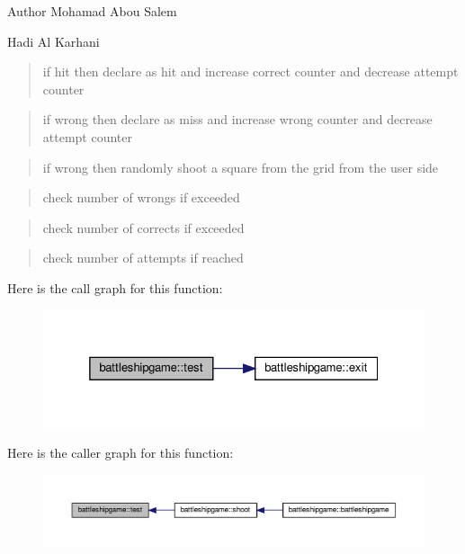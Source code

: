 \begin{DoxyAuthor}{Author}
Mohamad Abou Salem 

Hadi Al Karhani 
\end{DoxyAuthor}
\begin{quote}
if hit then declare as hit and increase correct counter and decrease attempt counter \end{quote}


\begin{quote}
if wrong then declare as miss and increase wrong counter and decrease attempt counter \end{quote}


\begin{quote}
if wrong then randomly shoot a square from the grid from the user side \end{quote}


\begin{quote}
check number of wrongs if exceeded \end{quote}


\begin{quote}
check number of corrects if exceeded \end{quote}


\begin{quote}
check number of attempts if reached \end{quote}
Here is the call graph for this function\+:
\nopagebreak
\begin{figure}[H]
\begin{center}
\leavevmode
\includegraphics[width=325pt]{classbattleshipgame_a2bc96daab5fee23ae0a5718416d52bec_cgraph}
\end{center}
\end{figure}
Here is the caller graph for this function\+:
\nopagebreak
\begin{figure}[H]
\begin{center}
\leavevmode
\includegraphics[width=350pt]{classbattleshipgame_a2bc96daab5fee23ae0a5718416d52bec_icgraph}
\end{center}
\end{figure}
\mbox{\label{classbattleshipgame_a894f81d8d9368923b8b6c49f373a916d}} 
